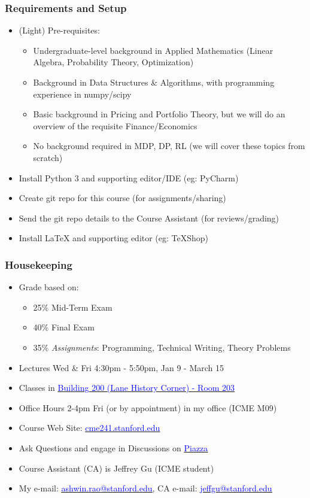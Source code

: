 \documentclass[handout]{beamer}
\begin{document}
\begin{frame}
\frametitle{Requirements and Setup}
\pause
\begin{itemize}[<+->]
\item (Light) Pre-requisites:
\begin{itemize}
\item Undergraduate-level background in Applied Mathematics (Linear Algebra, Probability Theory, Optimization)
\item Background in Data Structures \& Algorithms, with programming experience in numpy/scipy
\item Basic background in Pricing and Portfolio Theory, but we will do an overview of the requisite Finance/Economics
\item No background required in MDP, DP, RL (we will cover these topics from scratch)
\end{itemize}
\item Install Python 3 and supporting editor/IDE (eg: PyCharm)
\item Create git repo for this course (for assignments/sharing)
\item Send the git repo details to the Course Assistant (for reviews/grading)
\item Install LaTeX and supporting editor (eg: TeXShop)
\end{itemize}
\end{frame}


\begin{frame}
\frametitle{Housekeeping}
\pause
\begin{itemize}[<+->]
\item Grade based on:
\begin{itemize}
\item 25\% Mid-Term Exam
\item 40\% Final Exam
\item 35\% {\em Assignments}: Programming,  Technical Writing, Theory Problems
\end{itemize}
\item Lectures Wed \& Fri 4:30pm - 5:50pm, Jan 9  - March 15
\item Classes in \href{https://campus-map.stanford.edu/?srch=200-203}{\underline{\textcolor{blue}{Building 200 (Lane History Corner) - Room 203}}}
\item Office Hours 2-4pm Fri (or by appointment) in my office (ICME M09)
\item Course Web Site: \href{http://cme241.stanford.edu}{\underline{\textcolor{blue}{cme241.stanford.edu}}}
\item Ask Questions and engage in Discussions on \href{https://piazza.com/stanford/winter2019/cme241/home}{\underline{\textcolor{blue}{Piazza}}}
\item Course Assistant (CA) is Jeffrey Gu (ICME student)
\item My e-mail: \href{mailto:ashwin.rao@stanford.edu}{\underline{\textcolor{blue}{ashwin.rao@stanford.edu}}}, CA e-mail: \href{mailto:jeffgu@stanford.edu}{\underline{\textcolor{blue}{jeffgu@stanford.edu}}}
\end{itemize}
\end{frame}
\end{document}
